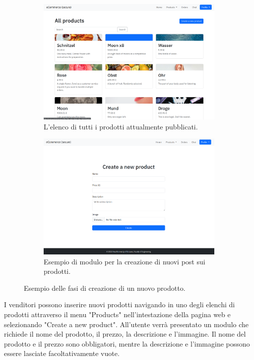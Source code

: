 \documentclass[conference,onecolumn,a4paper]{IEEEtran}
\begin{document}
{\begin{figure}[H]
    \centering
    \begin{subfigure}[b]{0.4\linewidth}
        \includegraphics[width=\linewidth]{resources/products.png}
        \caption{L'elenco di tutti i prodotti attualmente pubblicati.}
    \end{subfigure}
    \begin{subfigure}[b]{0.4\linewidth}
        \includegraphics[width=\linewidth]{resources/new-product.png}
        \caption{Esempio di modulo per la creazione di nuovi post sui prodotti.}
    \end{subfigure}
    \caption{Esempio delle fasi di creazione di un nuovo prodotto.}
\end{figure}

I venditori possono inserire nuovi prodotti navigando in uno degli elenchi di prodotti attraverso il menu "Products" nell'intestazione della pagina web e selezionando "Create a new product". All'utente verrà presentato un modulo che richiede il nome del prodotto, il prezzo, la descrizione e l'immagine. Il nome del prodotto e il prezzo sono obbligatori, mentre la descrizione e l'immagine possono essere lasciate facoltativamente vuote.

}
\end{document}
